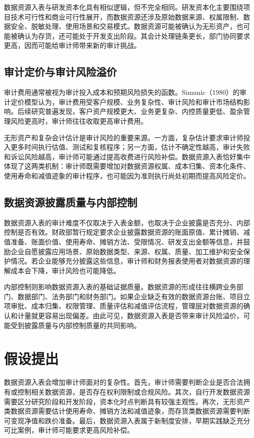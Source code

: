 \documentclass[UTF8,zihao=-4,a4paper]{ctexart}
\begin{document}
数据资源入表与研发资本化具有相似逻辑，但不完全相同。研发资本化主要围绕项目技术可行性和商业可行性展开，而数据资源还涉及原始数据来源、权属限制、数据安全、脱敏处理、使用场景和交易模式。数据资源可能被确认为无形资产，也可能被确认为存货，还可能处于开发支出阶段。其会计处理链条更长，部门协同要求更高，因而可能给审计师带来新的审计挑战。

\subsection{审计定价与审计风险溢价}

审计费用通常被视为审计投入成本和预期风险损失的函数。Simunic（1980）的审计定价模型认为，审计费用受客户规模、业务复杂性、审计风险和审计市场结构影响。后续研究普遍发现，客户资产规模更大、业务更复杂、内控质量更低、盈余管理风险更高时，审计师往往收取更高审计费用。

无形资产和复杂会计估计是审计风险的重要来源。一方面，复杂估计要求审计师投入更多时间执行估值、测试和复核程序；另一方面，估计不确定性越高，审计失败和诉讼风险越高，审计师可能通过提高收费进行风险补偿。数据资源入表恰好集中体现了这两类机制：审计师既需要增加对数据资源权属、成本归集、资本化条件、使用寿命和减值迹象的审计程序，也可能因为准则执行尚处初期而提高风险定价。

\subsection{数据资源披露质量与内部控制}

数据资源入表的审计难度不仅取决于入表金额，也取决于企业披露是否充分、内部控制是否有效。财政部暂行规定要求企业披露数据资源的账面原值、累计摊销、减值准备、账面价值、使用寿命、摊销方法、受限情况、研发支出金额等信息，并鼓励企业自愿披露应用场景、原始数据类型、来源、权属、质量、加工维护和安全保护情况。若企业能够充分披露这些信息，审计师和财务报表使用者对数据资源的理解成本会下降，审计风险也可能降低。

内部控制则影响数据资源入表的基础证据质量。数据资源的形成往往横跨业务部门、数据部门、法务部门和财务部门。如果企业缺乏有效的数据资源台账、项目立项审批、成本归集、权限管理、质量评估和减值评估流程，管理层对数据资源的确认和计量就更容易出现偏差。由此可见，数据资源入表是否带来审计风险溢价，可能受到披露质量与内部控制质量的共同影响。

\section{假设提出}

数据资源入表会增加审计师面对的复杂性。首先，审计师需要判断企业是否合法拥有或控制相关数据资源，是否存在权利限制或合规风险。其次，自行开发数据资源需要区分研究阶段和开发阶段，资本化时点判断具有较强主观性。再次，无形资产类数据资源需要估计使用寿命、摊销方法和减值迹象，而存货类数据资源需要判断可变现净值和跌价准备。最后，数据资源入表属于新制度安排，早期实践缺乏充分可比案例，审计师可能要求更高风险补偿。
\end{document}
